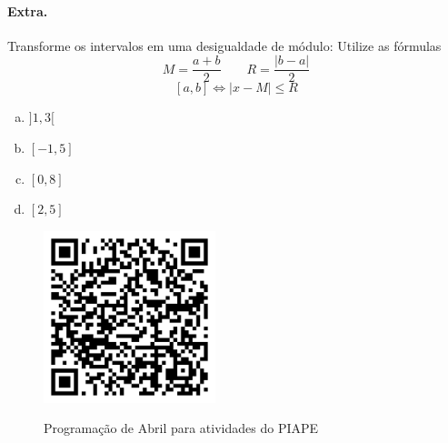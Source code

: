 \documentclass[a4paper,twocolumn,12pt]{article}
\begin{document}
\paragraph*{Extra.} Transforme os intervalos em uma desigualdade de módulo:
Utilize as fórmulas
$$M = \frac{a+b}{2} \qquad R = \frac{|b-a|}{2}$$
$$[a, b] \Leftrightarrow |x-M| \le R$$
\begin{enumerate}[a)]
\item $]1, 3[$
\item $[-1, 5]$
\item $[0, 8]$
\item $[2,5]$ 
\end{enumerate}

\vspace*{\fill}
\begin{figure}[b]
  \centering
  \includegraphics*[width=5cm]{img/programacao-abril.png}

  {\small Programação de Abril para atividades do PIAPE}
\end{figure}
\end{document}
